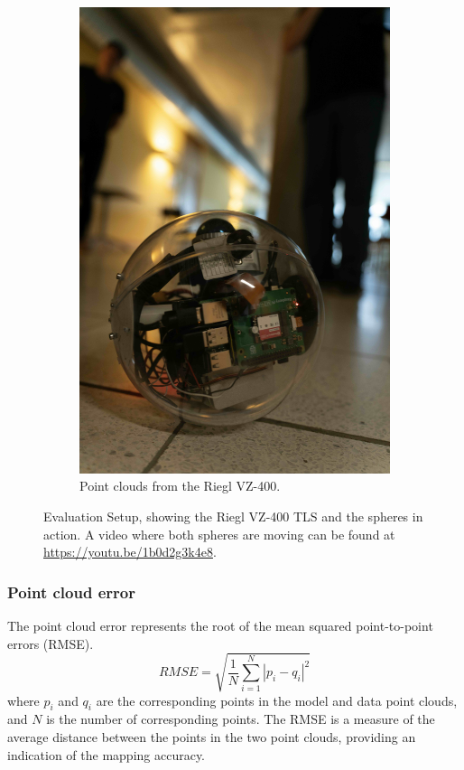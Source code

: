 \documentclass[conference]{IEEEtran}
\begin{document}
\begin{figure}[t]
\begin{subfigure}{0.48\columnwidth}
        \includegraphics[width=\textwidth]{pics/sphere_on_the_move.jpeg}
        \caption{Point clouds from the Riegl VZ-400.}
        \label{fig:sphere_on_the_move}
\end{subfigure}
\caption{Evaluation Setup, showing the Riegl VZ-400 TLS and the spheres in action. A video where both spheres are moving can be found at \url{https://youtu.be/1b0d2g3k4e8}.}

\end{figure}

\subsubsection{Point cloud error}
The point cloud error represents the root of the mean squared point-to-point errors (RMSE).
\begin{equation}
    RMSE = \sqrt{\frac{1}{N} \sum_{i=1}^{N} |p_i - q_i|^2}
\end{equation}
where \( p_i \) and \( q_i \) are the corresponding points in the model and data point clouds, and \( N\) is the number of corresponding points. 
The RMSE is a measure of the average distance between the points in the two point clouds, providing an indication of the mapping accuracy.
\end{document}
